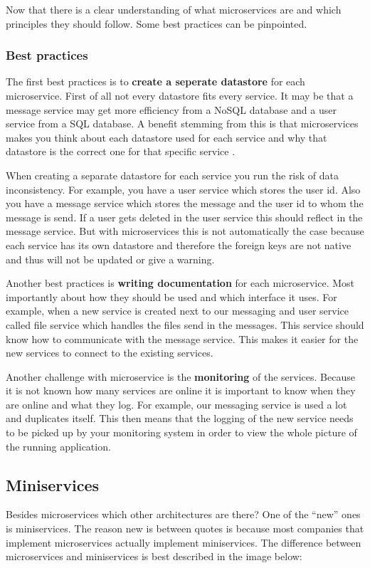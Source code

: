 Now that there is a clear understanding of what microservices are and which principles
they should follow. Some best practices can be pinpointed.

\subsubsection{Best practices}
The first best practices is to \textbf{create a seperate datastore} for each microservice. First of all not every datastore fits every service. It may be that a message service may get more efficiency from a NoSQL database and a user service from a SQL database. A benefit stemming from this is that microservices makes you think about each datastore used for each service and why that datastore is the correct one for that specific service \cite{microservicesNetflix}.

When creating a separate datastore for each service you run the risk of data inconsistency. For example, you have a user service which stores the user id. Also you have a message service which stores the message and the user id to whom the message is send. If a user gets deleted in the user service this should reflect in the message service. But with microservices this is not automatically the case because each service has its own datastore and therefore the foreign keys are not native and thus will not be updated or give a warning.

Another best practices is \textbf{writing documentation} \cite{microservicesBestPractice} for each microservice. Most importantly about how they should be used and which interface it uses. For example, when a new service is created next to our messaging and user service called file service which handles the files send in the messages. This service should know how to communicate with the message service. This makes it easier for the new services to connect to the existing services.

Another challenge with microservice is the \textbf{monitoring} \cite{microservicesBestPractice} of the services. Because it is not known how many services are online it is important to know when they are online and what they log. For example, our messaging service is used a lot and duplicates itself. This then means that the logging of the new service needs to be picked up by your monitoring system in order to view the whole picture of the running application.

\subsection{Miniservices}
Besides microservices which other architectures are there? One of the “new” ones is miniservices. The reason new is between quotes is because most companies that implement microservices actually implement miniservices. The difference between microservices and miniservices is best described in the image below:

